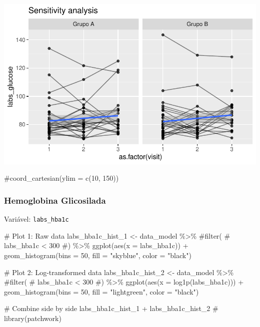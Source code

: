 \documentclass[
  12pt,
]{article}
\newenvironment{Shaded}{\begin{snugshade}}{\end{snugshade}}
\newcommand{\AttributeTok}[1]{\textcolor[rgb]{0.40,0.45,0.13}{#1}}
\newcommand{\CommentTok}[1]{\textcolor[rgb]{0.37,0.37,0.37}{#1}}
\newcommand{\DecValTok}[1]{\textcolor[rgb]{0.68,0.00,0.00}{#1}}
\newcommand{\FunctionTok}[1]{\textcolor[rgb]{0.28,0.35,0.67}{#1}}
\newcommand{\NormalTok}[1]{\textcolor[rgb]{0.00,0.23,0.31}{#1}}
\newcommand{\OtherTok}[1]{\textcolor[rgb]{0.00,0.23,0.31}{#1}}
\newcommand{\SpecialCharTok}[1]{\textcolor[rgb]{0.37,0.37,0.37}{#1}}
\newcommand{\StringTok}[1]{\textcolor[rgb]{0.13,0.47,0.30}{#1}}
\begin{document}
\includegraphics{Outcomes_files/figure-pdf/labs_glucose_6-2.pdf}

\begin{Shaded}
\begin{Highlighting}[]
    \CommentTok{\#coord\_cartesian(ylim = c(10, 150))}
\end{Highlighting}
\end{Shaded}

\subsubsection{Hemoglobina Glicosilada}\label{hemoglobina-glicosilada}

Variável: \texttt{labs\_hba1c}

\begin{Shaded}
\begin{Highlighting}[]
\CommentTok{\# Plot 1: Raw data}
\NormalTok{labs\_hba1c\_hist\_1 }\OtherTok{\textless{}{-}}\NormalTok{ data\_model }\SpecialCharTok{\%\textgreater{}\%} 
    \CommentTok{\#filter(}
    \CommentTok{\#    labs\_hba1c \textless{} 300}
    \CommentTok{\#) \%\textgreater{}\% }
    \FunctionTok{ggplot}\NormalTok{(}\FunctionTok{aes}\NormalTok{(}\AttributeTok{x =}\NormalTok{ labs\_hba1c)) }\SpecialCharTok{+} 
    \FunctionTok{geom\_histogram}\NormalTok{(}\AttributeTok{bins =} \DecValTok{50}\NormalTok{, }\AttributeTok{fill =} \StringTok{"skyblue"}\NormalTok{, }\AttributeTok{color =} \StringTok{"black"}\NormalTok{)}

\CommentTok{\# Plot 2: Log{-}transformed data}
\NormalTok{labs\_hba1c\_hist\_2 }\OtherTok{\textless{}{-}}\NormalTok{ data\_model }\SpecialCharTok{\%\textgreater{}\%} 
    \CommentTok{\#filter(}
    \CommentTok{\#    labs\_hba1c \textless{} 300}
    \CommentTok{\#) \%\textgreater{}\%}
    \FunctionTok{ggplot}\NormalTok{(}\FunctionTok{aes}\NormalTok{(}\AttributeTok{x =} \FunctionTok{log1p}\NormalTok{(labs\_hba1c))) }\SpecialCharTok{+} 
    \FunctionTok{geom\_histogram}\NormalTok{(}\AttributeTok{bins =} \DecValTok{50}\NormalTok{, }\AttributeTok{fill =} \StringTok{"lightgreen"}\NormalTok{, }\AttributeTok{color =} \StringTok{"black"}\NormalTok{)}

\CommentTok{\# Combine side by side}
\NormalTok{labs\_hba1c\_hist\_1 }\SpecialCharTok{+}\NormalTok{ labs\_hba1c\_hist\_2 }\CommentTok{\# library(patchwork)}
\end{Highlighting}
\end{Shaded}
\end{document}
